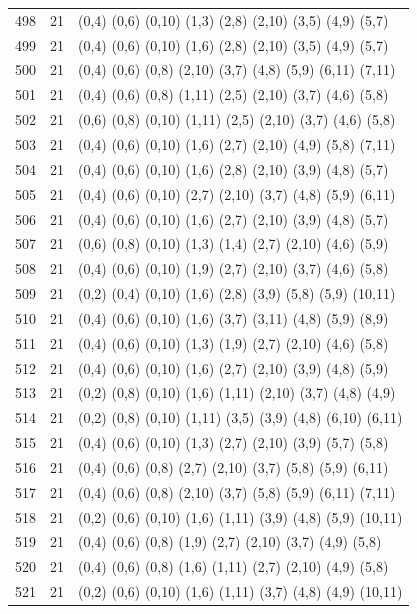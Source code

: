 {\begin{longtable}{lll}
498 & 21 & (0,4) (0,6) (0,10) (1,3) (2,8) (2,10) (3,5) (4,9) (5,7) \\
499 & 21 & (0,4) (0,6) (0,10) (1,6) (2,8) (2,10) (3,5) (4,9) (5,7) \\
500 & 21 & (0,4) (0,6) (0,8) (2,10) (3,7) (4,8) (5,9) (6,11) (7,11) \\
501 & 21 & (0,4) (0,6) (0,8) (1,11) (2,5) (2,10) (3,7) (4,6) (5,8) \\
502 & 21 & (0,6) (0,8) (0,10) (1,11) (2,5) (2,10) (3,7) (4,6) (5,8) \\
503 & 21 & (0,4) (0,6) (0,10) (1,6) (2,7) (2,10) (4,9) (5,8) (7,11) \\
504 & 21 & (0,4) (0,6) (0,10) (1,6) (2,8) (2,10) (3,9) (4,8) (5,7) \\
505 & 21 & (0,4) (0,6) (0,10) (2,7) (2,10) (3,7) (4,8) (5,9) (6,11) \\
506 & 21 & (0,4) (0,6) (0,10) (1,6) (2,7) (2,10) (3,9) (4,8) (5,7) \\
507 & 21 & (0,6) (0,8) (0,10) (1,3) (1,4) (2,7) (2,10) (4,6) (5,9) \\
508 & 21 & (0,4) (0,6) (0,10) (1,9) (2,7) (2,10) (3,7) (4,6) (5,8) \\
509 & 21 & (0,2) (0,4) (0,10) (1,6) (2,8) (3,9) (5,8) (5,9) (10,11) \\
510 & 21 & (0,4) (0,6) (0,10) (1,6) (3,7) (3,11) (4,8) (5,9) (8,9) \\
511 & 21 & (0,4) (0,6) (0,10) (1,3) (1,9) (2,7) (2,10) (4,6) (5,8) \\
512 & 21 & (0,4) (0,6) (0,10) (1,6) (2,7) (2,10) (3,9) (4,8) (5,9) \\
513 & 21 & (0,2) (0,8) (0,10) (1,6) (1,11) (2,10) (3,7) (4,8) (4,9) \\
514 & 21 & (0,2) (0,8) (0,10) (1,11) (3,5) (3,9) (4,8) (6,10) (6,11) \\
515 & 21 & (0,4) (0,6) (0,10) (1,3) (2,7) (2,10) (3,9) (5,7) (5,8) \\
516 & 21 & (0,4) (0,6) (0,8) (2,7) (2,10) (3,7) (5,8) (5,9) (6,11) \\
517 & 21 & (0,4) (0,6) (0,8) (2,10) (3,7) (5,8) (5,9) (6,11) (7,11) \\
518 & 21 & (0,2) (0,6) (0,10) (1,6) (1,11) (3,9) (4,8) (5,9) (10,11) \\
519 & 21 & (0,4) (0,6) (0,8) (1,9) (2,7) (2,10) (3,7) (4,9) (5,8) \\
520 & 21 & (0,4) (0,6) (0,8) (1,6) (1,11) (2,7) (2,10) (4,9) (5,8) \\
521 & 21 & (0,2) (0,6) (0,10) (1,6) (1,11) (3,7) (4,8) (4,9) (10,11) \\

\end{longtable}}
